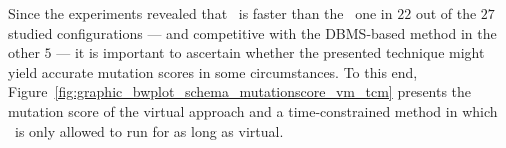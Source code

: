 


% 

 Since the experiments revealed that \vma~is faster than the
\Original~one in $22$ out of the $27$ studied configurations --- and competitive with the DBMS-based method in the other
$5$ --- it is important to ascertain whether the presented technique might yield accurate mutation scores in some
circumstances. To this end, Figure~\ref{fig:graphic_bwplot_schema_mutationscore_vm_tcm} presents the mutation score of
the virtual approach and a time-constrained method in which \Original~is only allowed to run for as long as virtual.





